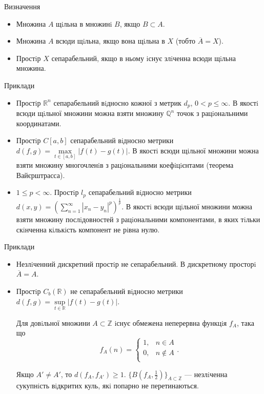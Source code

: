 Визначення
\begin{itemize}
    \item Множина $A$ щiльна в множинi $B$, якщо $B \subset A$.
    \item Множина $A$ всюди щiльна, якщо вона щiльна в $X$ (тобто $\overline{A} = X$).
    \item Простiр $X$ сепарабельний, якщо в ньому iснує злiченна всюди щiльна множина.
\end{itemize}

Приклади
\begin{itemize}
    \item Простiр $\mathbb{R}^n$ сепарабельний вiдносно кожної з метрик $d_p$,
    $0 < p \leqslant \infty$. В якостi всюди щiльної множини можна взяти множину
    $\mathbb{Q}^n$ точок з рацiональними координатами.
    
    \item Простiр $C[a, b]$ сепарабельний вiдносно метрики
    $d(f, g) = \max\limits_{t \in [a,b]} |f(t) - g(t)|$.
    В якостi всюди щiльної множини можна
    взяти множину многочленiв з рацiональними коефiцiєнтами (теорема
    Вайєрштрасса).
    
    \item $1 \leqslant p < \infty$. Простiр $l_p$ сепарабельний вiдносно метрики
    $d(x, y) = ( \sum\limits_{n=1}^{\infty} |x_n - y_n|^{p})^{\frac{1}{p}}$.
    В якостi всюди щiльної множини можна
    взяти множину послiдовностей з рацiональними компонентами, в яких
    тiльки скiнченна кiлькiсть компонент не рiвна нулю.
\end{itemize}

Приклади
\begin{itemize}
    \item Незлiченний дискретний простiр не сепарабельний. В дискретному
    просторi $\overline{A} = A$.
    
    \item Простiр $C_b(\mathbb{R})$ не сепарабельний вiдносно метрики
    $d(f, g) = \sup\limits_{t \in \mathbb{R}} |f(t) - g(t)|$.
    
    Для довiльної множини $A \subset \mathbb{Z}$ iснує обмежена неперервна функцiя $f_A$,
    така що
    $$f_A(n) = \left\{ \begin{array}{ll}
        1, & n \in A \\
        0, & n \not\in A \\
    \end{array} \right. .$$
    
    Якщо $A' \neq A'$, то $d(f_A, f_{A'}) \geqslant 1$. $\{B(f_A, \frac{1}{2})\}_{A \subset \mathbb{Z}}$
    --- незлiченна сукупнiсть вiдкритих куль, якi попарно не перетинаються.
\end{itemize}

